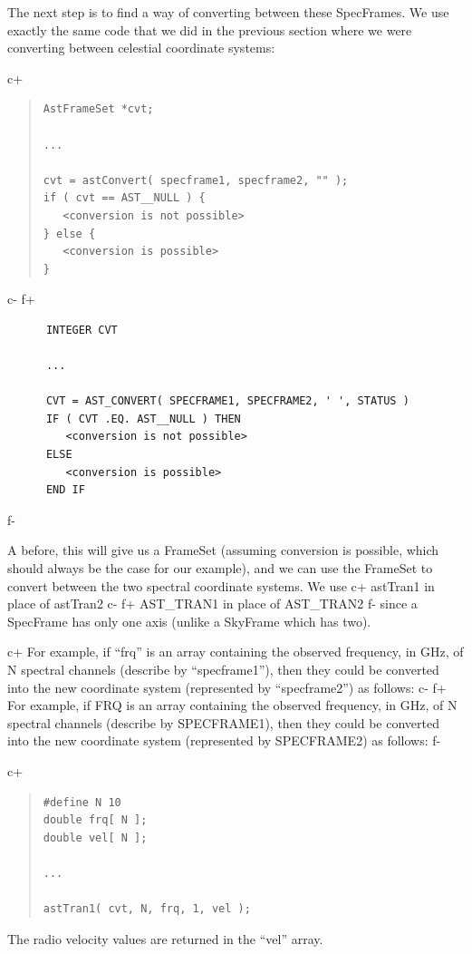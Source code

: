 \documentclass[twoside,11pt]{article}
\begin{document}
The next step is to find a way of converting between these SpecFrames. We
use exactly the same code that we did in the previous section where we were
converting between celestial coordinate systems:

c+
\begin{quote}
\small
\begin{verbatim}
AstFrameSet *cvt;

...

cvt = astConvert( specframe1, specframe2, "" );
if ( cvt == AST__NULL ) {
   <conversion is not possible>
} else {
   <conversion is possible>
}
\end{verbatim}
\normalsize
\end{quote}
c-
f+
\small
\begin{verbatim}
      INTEGER CVT

      ...

      CVT = AST_CONVERT( SPECFRAME1, SPECFRAME2, ' ', STATUS )
      IF ( CVT .EQ. AST__NULL ) THEN
         <conversion is not possible>
      ELSE
         <conversion is possible>
      END IF
\end{verbatim}
\normalsize
f-

A before, this will give us a FrameSet (assuming conversion is possible,
which should always be the case for our example), and we can use the
FrameSet to convert between the two spectral coordinate systems. We use
c+
astTran1 in place of astTran2
c-
f+
AST\_TRAN1 in place of AST\_TRAN2
f-
since a SpecFrame has only one axis (unlike a SkyFrame which has two).

c+
For example, if ``frq'' is an array containing the observed frequency, in
GHz, of N spectral channels (describe by ``specframe1''), then they
could be converted into the new coordinate system (represented by
``specframe2'') as follows:
c-
f+
For example, if FRQ is an array containing the observed frequency, in
GHz, of N spectral channels (describe by SPECFRAME1), then they
could be converted into the new coordinate system (represented by
SPECFRAME2) as follows:
f-

c+
\begin{quote}
\small
\begin{verbatim}
#define N 10
double frq[ N ];
double vel[ N ];

...

astTran1( cvt, N, frq, 1, vel );
\end{verbatim}
\normalsize
\end{quote}

The radio velocity values are returned in the ``vel'' array.
\end{document}
